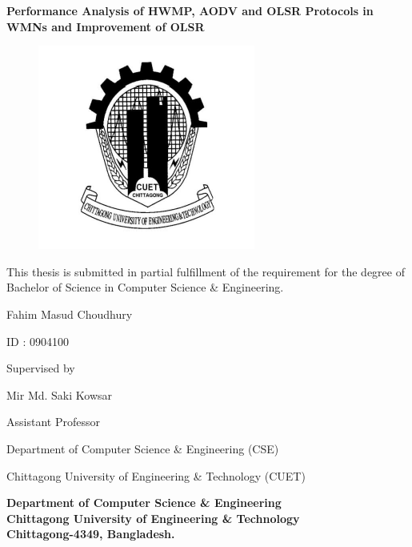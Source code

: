 \begin{center}
\textbf{{\large Performance Analysis of HWMP, AODV and OLSR Protocols in WMNs and Improvement of OLSR} }
\end{center}


\begin{figure}[hbtp]
\Centering
\includegraphics[scale=.75]{cuet-logo.png}
\end{figure}




\begin{center}
This thesis is submitted in partial fulfillment of the requirement for the degree of 
Bachelor of Science in Computer Science \& Engineering. \newline
\end{center}

\begin{center}
Fahim Masud Choudhury
\end{center}

\begin{center}
ID : 0904100
\end{center}


\vspace{20mm}

\begin{center}
Supervised by \

Mir Md. Saki Kowsar \

Assistant Professor \

Department of Computer Science \& Engineering (CSE) \

Chittagong University of Engineering \& Technology (CUET)
\end{center}




\vfill
\begin{center}
\textbf{{\large Department of Computer Science \& Engineering} \\
{\normalsize Chittagong University of Engineering \& Technology} \\
{\small Chittagong-4349, Bangladesh.}}
\end{center}

